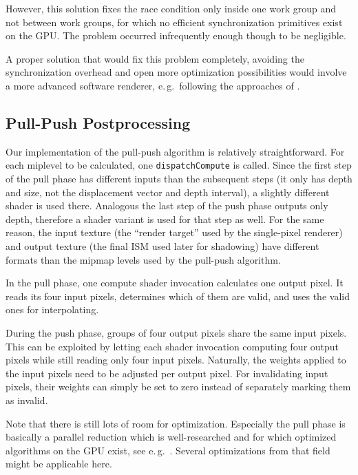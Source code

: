  However, this solution fixes the race condition only inside one work group and not between work groups, for which no efficient synchronization primitives exist on the GPU. The problem occurred infrequently enough though to be negligible.

 A proper solution that would fix this problem completely, avoiding the synchronization overhead and open more optimization possibilities would involve a more advanced software renderer, e.\,g.\ following the approaches of \cite{Laine:2011:SoftwareRasterization}.


 \subsection{Pull-Push Postprocessing}
 \label{sec:impl:pullPushPostprocessing}

 Our implementation of the pull-push algorithm is relatively straightforward. For each miplevel to be calculated, one \texttt{dispatchCompute} is called. Since the first step of the pull phase has different inputs than the subsequent steps (it only has depth and size, not the displacement vector and depth interval), a slightly different shader is used there. Analogous the last step of the push phase outputs only depth, therefore a shader variant is used for that step as well. For the same reason, the input texture (the ``render target'' used by the single-pixel renderer) and output texture (the final ISM used later for shadowing) have different formats than the mipmap levels used by the pull-push algorithm.



 In the pull phase, one compute shader invocation calculates one output pixel. It reads its four input pixels, determines which of them are valid, and uses the valid ones for interpolating.


 During the push phase, groups of four output pixels share the same input pixels. This can be exploited by letting each shader invocation computing four output pixels while still reading only four input pixels. Naturally, the weights applied to the input pixels need to be adjusted per output pixel. For invalidating input pixels, their weights can simply be set to zero instead of separately marking them as invalid.


 Note that there is still lots of room for optimization. Especially the pull phase is basically a parallel reduction which is well-researched and for which optimized algorithms on the GPU exist, see e.\,g.\ \cite{Harris:2007:ParallelReduction}. Several optimizations from that field might be applicable here.






